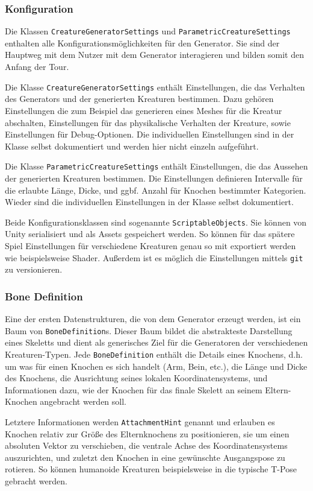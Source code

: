 \subsubsection{Konfiguration}
Die Klassen \texttt{Creature\-Generator\-Settings} und \texttt{Parametric\-Creature\-Settings} enthalten alle Konfigurationsmöglichkeiten für den Generator.
Sie sind der Hauptweg mit dem Nutzer mit dem Generator interagieren und bilden somit den Anfang der Tour.

Die Klasse \texttt{CreatureGeneratorSettings} enthält Einstellungen, die das Verhalten des Generators und der generierten Kreaturen bestimmen.
Dazu gehören Einstellungen die zum Beispiel das generieren eines Meshes für die Kreatur abschalten, Einstellungen für das physikalische Verhalten der Kreature, sowie Einstellungen für Debug-Optionen.
Die individuellen Einstellungen sind in der Klasse selbst dokumentiert und werden hier nicht einzeln aufgeführt.

Die Klasse \texttt{ParametricCreatureSettings} enthält Einstellungen, die das Aussehen der generierten Kreaturen bestimmen.
Die Einstellungen definieren Intervalle für die erlaubte Länge, Dicke, und ggbf. Anzahl für Knochen bestimmter Kategorien.
Wieder sind die individuellen Einstellungen in der Klasse selbst dokumentiert.

Beide Konfigurationsklassen sind sogenannte \texttt{ScriptableObjects}.
Sie können von Unity serialisiert und als Assets gespeichert werden.
So können für das spätere Spiel Einstellungen für verschiedene Kreaturen genau so mit exportiert werden wie beispielsweise Shader.
Außerdem ist es möglich die Einstellungen mittels \texttt{git} zu versionieren.

\subsubsection{Bone Definition}
Eine der ersten Datenstrukturen, die von dem Generator erzeugt werden, ist ein Baum von \texttt{BoneDefinition}s.
Dieser Baum bildet die abstrakteste Darstellung eines Skeletts und dient als generisches Ziel für die Generatoren der verschiedenen Kreaturen-Typen.
Jede \texttt{BoneDefinition} enthält die Details eines Knochens, d.h. um was für einen Knochen es sich handelt (Arm, Bein, etc.), die Länge und Dicke des Knochens, die Ausrichtung seines lokalen Koordinatensystems, und Informationen dazu, wie der Knochen für das finale Skelett an seinem Eltern-Knochen angebracht werden soll.

Letztere Informationen werden \texttt{AttachmentHint} genannt und erlauben es Knochen relativ zur Größe des Elternknochens zu positionieren, sie um einen absoluten Vektor zu verschieben, die ventrale Achse des Koordinatensystems auszurichten, und zuletzt den Knochen in eine gewünschte Ausgangspose zu rotieren.
So können humanoide Kreaturen beispielsweise in die typische T-Pose gebracht werden.


